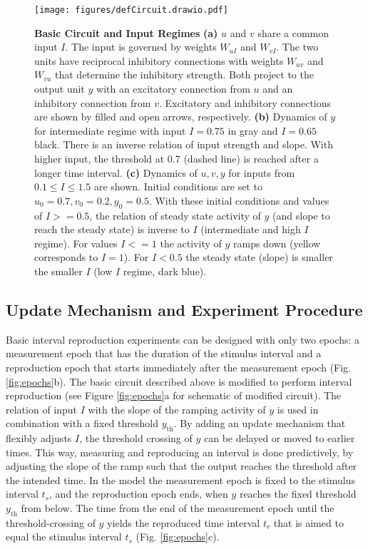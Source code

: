 \documentclass[10pt]{article}
\begin{document}
\begin{figure}[ht]
	\centering
	\texttt{[image: figures/defCircuit.drawio.pdf]}
	\caption{\textbf{Basic Circuit and Input Regimes} 
	\textbf{(a)} $u$ and $v$ share a common input $I$. The input is governed by weights $W_{uI}$ and $W_{vI}$. The two units have reciprocal inhibitory connections with weights $W_{uv}$ and $W_{vu}$ that determine the inhibitory strength. Both project to the output unit $y$ with an excitatory connection from $u$ and an inhibitory connection from $v$. Excitatory and inhibitory connections are shown by filled and open arrows, respectively. 
	\textbf{(b)} Dynamics of $y$ for intermediate regime with input $I=0.75$ in gray and $I=0.65$ black. There is an inverse relation of input strength and slope. With higher input, the threshold at 0.7 (dashed line) is reached after a longer time interval. 
	\textbf{(c)} Dynamics of $u, v, y$ for inputs from $0.1\leq I \leq 1.5$ are shown. Initial conditions are set to $u_0=0.7 , v_0=0.2 , y_0=0.5$. With these initial conditions and values of $I>=0.5$, the relation of steady state activity of $y$ (and slope to reach the steady state) is inverse to $I$ (intermediate and high $I$ regime). For values $I<=1$ the activity of $y$ ramps down (yellow corresponds to $I=1$). For $I<0.5$ the steady state (slope) is smaller the smaller $I$ (low $I$ regime, dark blue).}
\label{fig:circuit}
\end{figure}

\subsection{Update Mechanism and Experiment Procedure}
Basic interval reproduction experiments can be designed with only two epochs: a measurement epoch that has the duration of the stimulus interval and a reproduction epoch that starts immediately after the measurement epoch (Fig. \ref{fig:epochs}b). 
The basic circuit described above is modified to perform interval reproduction (see Figure \ref{fig:epochs}a for schematic of modified circuit).
The relation of input $I$ with the slope of the ramping activity of $y$ is used in combination with a fixed threshold $y_{\text{th}}$.
By adding an update mechanism that flexibly adjusts $I$, the threshold crossing of $y$ can be delayed or moved to earlier times.
This way, measuring and reproducing an interval is done predictively, by adjusting the slope of the ramp such that the output reaches the threshold after the intended time.
In the model the measurement epoch is fixed to the stimulus interval $t_s$, and the reproduction epoch ends, when $y$ reaches the fixed threshold $y_{\text{th}}$ from below. 
The time from the end of the measurement epoch until the threshold-crossing of $y$ yields the reproduced time interval $t_r$ that is aimed to equal the stimulus interval $t_s$ (Fig. \ref{fig:epochs}c).
\end{document}
